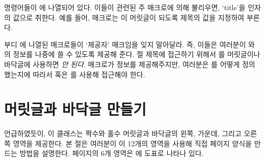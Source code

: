  명령어들이 에 나열되어 있다. 이들이 관련된 주
매크로에 의해 불리우면, `title'을 인자의 값으로 취한다.
예를 들어, \cmd{\chapter} 매크로는 \cmd{\chaptermark}이 머릿글이 되도록 제목의
값을 지정하여 부른다.

부디 에 나열된 매크로들이 `제공자' 매크임을 잊지 말아달라.
즉, 이들은 여러분이 \cmd{\leftmark}와 \cmd{\rightmark}의 정보를 나중에 쓸 수
있도록 제공해 준다.
절 제목에 접근하기 위해서 \cmd{\sectionmark}를 머릿글이나 바닥글에 사용하면
\emph{안 된다}.
매크로가 정보를 제공해주지만, 여러분은 \cmd{\sectionmark}를 어떻게 정의했는지에
따라서 \cmd{\leftmark} 혹은 \cmd{\rightmark}를 사용해 접근해야 한다.


\section{머릿글과 바닥글 만들기}

언급하였듯이, 이 클래스는 짝수와 홀수 머릿글과
바닥글의 왼쪽, 가운데, 그리고 오른쪽 영역을 제공한다.
본 절은 여러분이 이 12개의 영역을 사용해 직접 페이지 양식을 만드는 방법을
설명한다.
페이지의 6개 영역은 에 도표로 나타나 있다.

